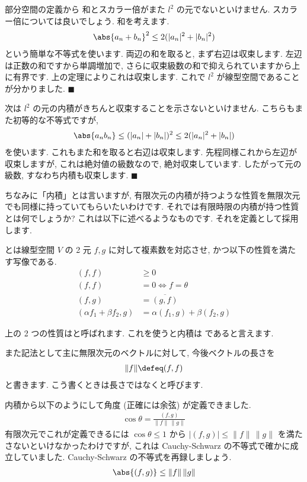 \documentclass[openany, a4paper, oneside]{jsbook}
\begin{document}
部分空間の定義から
和とスカラー倍がまた $l^2$ の元でないといけません. スカラー倍については良いでしょう.
和を考えます.
\begin{align}
\abs{a_n + b_n}^2 \leq 2 (|a_n|^2 + |b_n|^2)
\end{align}
という簡単な不等式を使います.
両辺の和を取ると, まず右辺は収束します. 左辺は正数の和ですから単調増加で,
さらに収束級数の和で抑えられていますから上に有界です. 上の定理によりこれは収束します.
これで $l^2$ が線型空間であることが分かりました.  $\blacksquare$

次は $l^2$ の元の内積がきちんと収束することを示さないといけません. こちらもまた初等的な不等式ですが,
\begin{align}
\abs{a_n b_n}
\leq (|a_n| + |b_n|)^2 \leq 2 (|a_n|^2 + |b_n|)
\end{align}
を使います. これもまた和を取ると右辺は収束します. 先程同様これから左辺が収束しますが,
これは絶対値の級数なので, 絶対収束しています. したがって元の級数, すなわち内積も収束します.  $\blacksquare$

ちなみに「内積」とは言いますが, 有限次元の内積が持つような性質を無限次元でも同様に持っていてもらいたいわけです.
それでは有限時限の内積が持つ性質とは何でしょうか? これは以下に述べるようなものです. それを定義として採用します.
\begin{defn}とは線型空間 $V$ の 2 元 $f,g$ に対して複素数を対応させ, かつ以下の性質を満たす写像である.
\begin{align}
    (f,f) &\geq 0 \\
    (f,f) &= 0 \Longleftrightarrow f = \theta \\
    (f,g) &= \overline{(g,f)} \\
    (\alpha f_1 +\beta f_2 ,g) &= \alpha (f_1,g) + \beta (f_2,g)
\end{align}
\end{defn}
上の 2 つの性質はと呼ばれます. これを使うと内積は
であると言えます.

また記法として主に無限次元のベクトルに対して, 今後ベクトルの長さを
\begin{align}
    \| f \| \defeq (f,f)
\end{align}
と書きます. こう書くときは長さではなくと呼びます.

内積から以下のようにして角度 (正確には余弦) が定義できました.
\begin{align}
\cos \theta = \frac{(f,g)}{\| f \| \, \| g \|}
\end{align}
有限次元でこれが定義できるには $\cos \theta \leq 1$ から $|(f,g)| \leq \|f\| \, \|g \|$ を満たさないといけなかったわけですが,
これは Cauchy-Schwarz の不等式で確かに成立していました. Cauchy-Schwarz の不等式を再録しましょう.
\begin{align}
\abs{(f,g)} \leq \| f \| \, \| g \|
\end{align}
\end{document}
